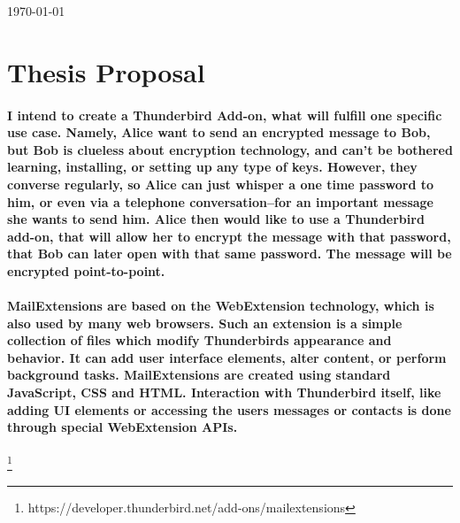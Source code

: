 \documentclass[12pt,a4paper]{article}
\begin{document}
\begin{titlepage}
	
	
	\vfill\vfill\vfill %
	
	{\large\today} %
	
	

	 
	
	\vfill %
	
\end{titlepage}

\section{Thesis Proposal} %

\paragraph{I intend to create a Thunderbird Add-on, what will fulfill one specific use case. Namely, Alice want to send an encrypted message to Bob, but Bob is clueless about encryption technology, and can't be bothered learning, installing, or setting up any type of keys. However, they converse regularly, so Alice can just whisper a one time password to him, or even via a telephone conversation--for an important message she wants to send him. Alice then would like to use a Thunderbird add-on, that will allow her to encrypt the message with that password, that Bob can later open with that same password. The message will be encrypted point-to-point.}


\paragraph{MailExtensions are based on the WebExtension technology, which is also used by many web browsers. Such an extension is a simple collection of files which modify Thunderbirds appearance and behavior. It can add user interface elements, alter content, or perform background tasks. MailExtensions are created using standard JavaScript, CSS and HTML. Interaction with Thunderbird itself, like adding UI elements or accessing the users messages or contacts is done through special WebExtension APIs.}\footnote{https://developer.thunderbird.net/add-ons/mailextensions}
\end{document}
